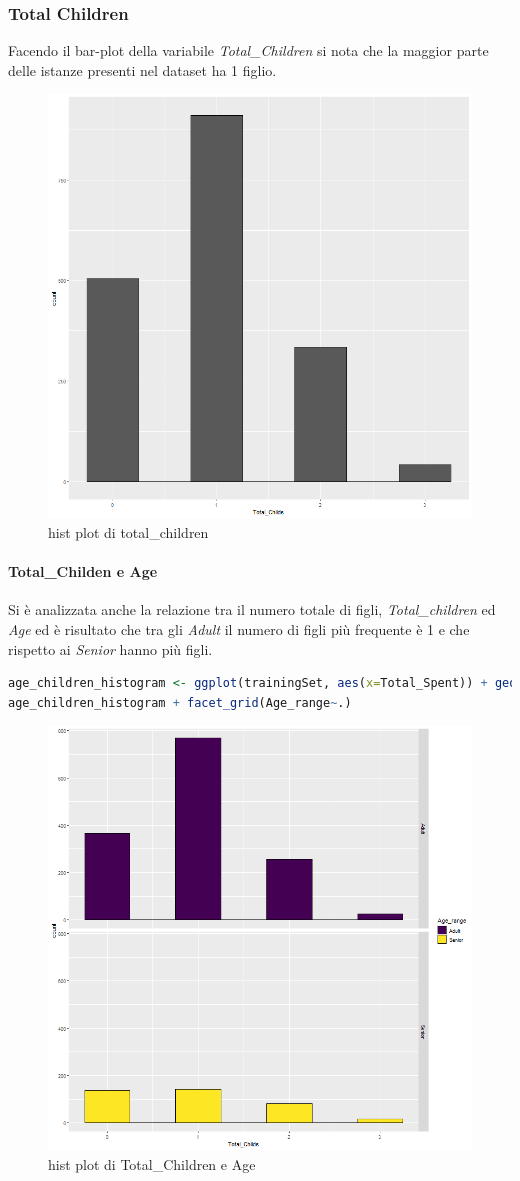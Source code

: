 \documentclass[letterpaper,11pt]{article}
\begin{document}
\newpage
\subsubsection{Total Children}
Facendo il bar-plot della variabile \textit{Total\_Children} si nota che la maggior parte delle istanze presenti nel dataset ha 1 figlio.



\begin{figure}[h!]
    \centering
    \includegraphics[width=.6\textwidth]{Img/EDA/EDA015.png}
    \caption{hist plot di total\_children }
\end{figure}

\newpage

\paragraph{Total\_Childen e Age}
Si è analizzata anche la relazione tra il numero totale di figli, \textit{Total\_children} ed \textit{Age} ed è risultato che tra gli \textit{Adult} il numero di figli più frequente è 1 e che rispetto ai \textit{Senior} hanno più figli.

\begin{lstlisting}[language=R]
age_children_histogram <- ggplot(trainingSet, aes(x=Total_Spent)) + geom_histogram(aes(fill=Age_range), binwidth = 0.5, colour = "Black")
age_children_histogram + facet_grid(Age_range~.)
\end{lstlisting}
\begin{figure}[h!]
    \centering
    \includegraphics[width=.6\textwidth]{Img/EDA/EDA016.png}
    \caption{hist plot di Total\_Children e Age}
    \label{fig:fviz_eig(pca, addlabels = TRUE, ylim = c(0, 50))}
\end{figure}
\end{document}

